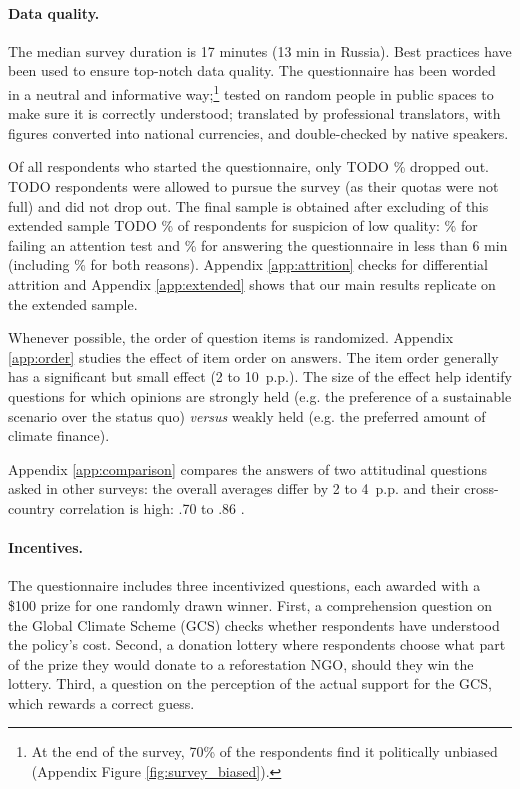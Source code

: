 \documentclass[12pt,english]{article}
\begin{document}
\begin{bibunit}
\paragraph{Data quality.} 
The median survey duration is 17 minutes (13 min in Russia). %
Best practices have been used to ensure top-notch data quality. 
The questionnaire has been worded in a neutral and informative way;\footnote{At the end of the survey, 70\% of the respondents find it politically unbiased (Appendix Figure \ref{fig:survey_biased}).} tested on random people in public spaces to make sure it is correctly understood; translated by professional translators, with figures converted into national currencies, and double-checked by native speakers.

Of all respondents who started the questionnaire, only TODO \% dropped out. TODO respondents were allowed to pursue the survey (as their quotas were not full) and did not drop out.  The final sample is obtained after excluding of this extended sample TODO \% of respondents for suspicion of low quality: \% for failing an attention test and \% for answering the questionnaire in less than 6 min (including \% for both reasons). Appendix \ref{app:attrition} checks for differential attrition and Appendix \ref{app:extended} shows that our main results replicate on the extended sample. 

Whenever possible, the order of question items is randomized. Appendix \ref{app:order} studies the effect of item order on answers. The item order generally has a significant but small effect (2 to 10~p.p.). The size of the effect help identify questions for which opinions are strongly held (e.g. the preference of a sustainable scenario over the status quo) \textit{versus} weakly held (e.g. the preferred amount of climate finance). %

Appendix \ref{app:comparison} compares the answers of two attitudinal questions asked in other surveys: the overall averages differ by 2 to 4~p.p. and their cross-country correlation is high: .70 \citep{global_nation_global_2023} to .86 \citep{cappelen_majority_2025}. 

\paragraph{Incentives.}
The questionnaire includes three incentivized questions, each awarded with a \$100 prize for one randomly drawn winner. First, a comprehension question on the Global Climate Scheme (GCS) checks whether respondents have understood the policy's cost. %
Second, a donation lottery where respondents choose what part of the prize they would donate to a reforestation NGO, should they win the lottery. Third, a question on the perception of the actual support for the GCS, which rewards a correct guess.


\end{bibunit}
\end{document}
